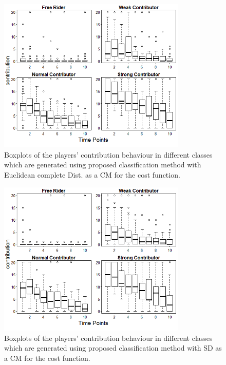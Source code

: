 \begin{figure}[!h]
    \centering
    \includegraphics[width=0.8\textwidth]{images/chapter5/ColpleteCost_PGG10_Boxplot.png}
    \caption{Boxplots of the players' contribution behaviour in different classes which are generated using proposed classification method with Euclidean complete Dist. as a CM for the cost function.}
    \label{fig:ColpleteCost_PGG10_Boxplot}
\end{figure}

\begin{figure}[!h]
    \centering
    \includegraphics[width=0.8\textwidth]{images/chapter5/SDCost_PGG10_Boxplot.png}
    \caption{Boxplots of the players' contribution behaviour in different classes which are generated using proposed classification method with SD as a CM for the cost function.}
    \label{fig:SDCost_PGG10_Boxplot}
\end{figure}


